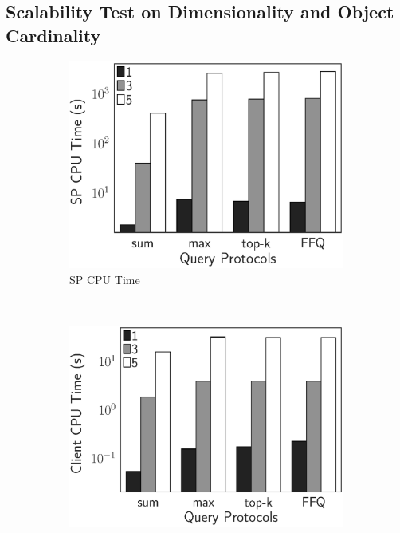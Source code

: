 \subsection{Scalability Test on Dimensionality and Object Cardinality}

\begin{figure}[t]
  \centering
  \begin{subfigure}[b]{.33\linewidth}
    \centering
    \includegraphics[width=\linewidth]{exp-figs/aggregate-queries/dimension_sp.eps}
    \caption{SP CPU Time}
  \end{subfigure}~%
  \begin{subfigure}[b]{.33\linewidth}
    \centering
    \includegraphics[width=\linewidth]{exp-figs/aggregate-queries/dimension_client.eps}

\end{subfigure}
\end{figure}
